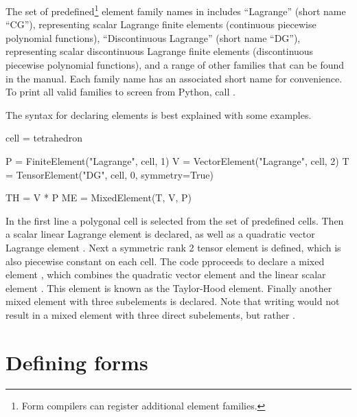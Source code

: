 The set of predefined\footnote{Form compilers can register additional
  element families.}  element family names in \ufl{} includes
``Lagrange'' (short name ``CG''), representing scalar Lagrange finite
elements (continuous piecewise polynomial functions), ``Discontinuous
Lagrange'' (short name ``DG''), representing scalar discontinuous
Lagrange finite elements (discontinuous piecewise polynomial
functions), and a range of other families that can be found in the
manual.  Each family name has an associated short name for
convenience.  To print all valid families to screen from Python, call
.

The syntax for declaring elements is best explained with some
examples.
\begin{python}
cell = tetrahedron

P = FiniteElement("Lagrange", cell, 1)
V = VectorElement("Lagrange", cell, 2)
T = TensorElement("DG", cell, 0, symmetry=True)

TH = V * P
ME = MixedElement(T, V, P)
\end{python}
In the first line a polygonal cell is selected from the set of
predefined cells.  Then a scalar linear Lagrange element
 is declared, as well as a quadratic vector Lagrange element
.  Next a symmetric rank 2 tensor element  is
defined, which is also piecewise constant on each cell.  The code
pproceeds to declare a mixed element , which combines the
quadratic vector element  and the linear scalar element
. This element is known as the Taylor-Hood element.  Finally
another mixed element with three subelements is declared. Note that
writing  would not result in a mixed element with
three direct subelements, but rather
.

\section{Defining forms}
\label{ufl:sec:forms}

